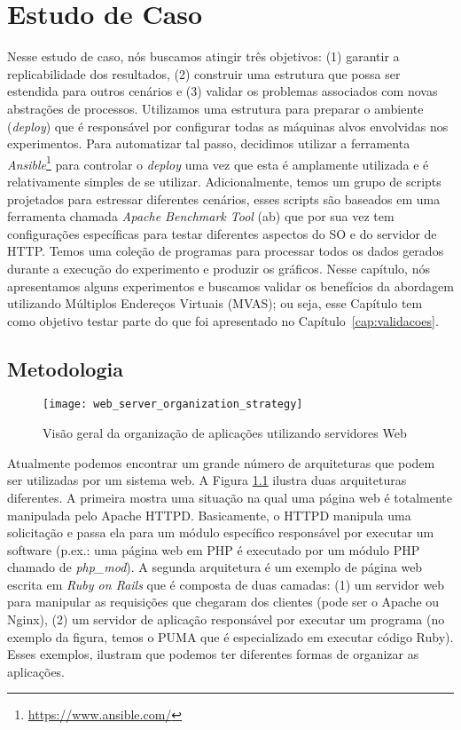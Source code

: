 \chapter{Estudo de Caso}
\label{cap:estudo-de-caso}

Nesse estudo de caso, nós buscamos atingir três objetivos: (1) garantir a
replicabilidade dos resultados, (2) construir uma estrutura que possa ser
estendida para outros cenários e (3) validar os problemas associados com novas
abstrações de processos. Utilizamos uma estrutura para preparar o ambiente
(\emph{deploy}) que é responsável por configurar todas as máquinas alvos
envolvidas nos experimentos. Para automatizar tal passo, decidimos utilizar a
ferramenta \emph{Ansible}\footnote{\url{https://www.ansible.com/}} para
controlar o \emph{deploy} uma vez que esta é amplamente utilizada e é
relativamente simples de se utilizar. Adicionalmente, temos um grupo de scripts
projetados para estressar diferentes cenários, esses scripts são baseados em
uma ferramenta chamada \emph{Apache Benchmark Tool} (ab) que por sua vez tem
configurações específicas para testar diferentes aspectos do SO e do servidor
de HTTP. Temos uma coleção de programas para processar todos os dados gerados
durante a execução do experimento e produzir os gráficos. Nesse capítulo, nós
apresentamos alguns experimentos e buscamos validar os benefícios da abordagem
utilizando Múltiplos Endereços Virtuais (MVAS); ou seja, esse Capítulo tem como
objetivo testar parte do que foi apresentado no Capítulo~\ref{cap:validacoes}.

\section{Metodologia} \label{sec:metodologia}

\begin{figure}[!h] \centering
\texttt{[image: web\_server\_organization\_strategy]}
\caption{Visão geral da organização de aplicações utilizando servidores Web}
\label{fig:web_server} \end{figure}

Atualmente podemos encontrar um grande número de arquiteturas que podem ser
utilizadas por um sistema web. A Figura \ref{fig:web_server} ilustra duas
arquiteturas diferentes. A primeira mostra uma situação na qual uma página web
é totalmente manipulada pelo Apache HTTPD. Basicamente, o HTTPD manipula uma
solicitação e passa ela para um módulo específico responsável por executar um
software (p.ex.: uma página web em PHP é executado por um módulo PHP chamado de
\emph{php\_mod}). A segunda arquitetura é um exemplo de página web escrita em
\emph{Ruby on Rails} que é composta de duas camadas: (1) um servidor web para
manipular as requisições que chegaram dos clientes (pode ser o Apache ou
Nginx), (2) um servidor de aplicação responsável por executar um programa (no
exemplo da figura, temos o PUMA que é especializado em executar código Ruby).
Esses exemplos, ilustram que podemos ter diferentes formas de organizar as
aplicações.

